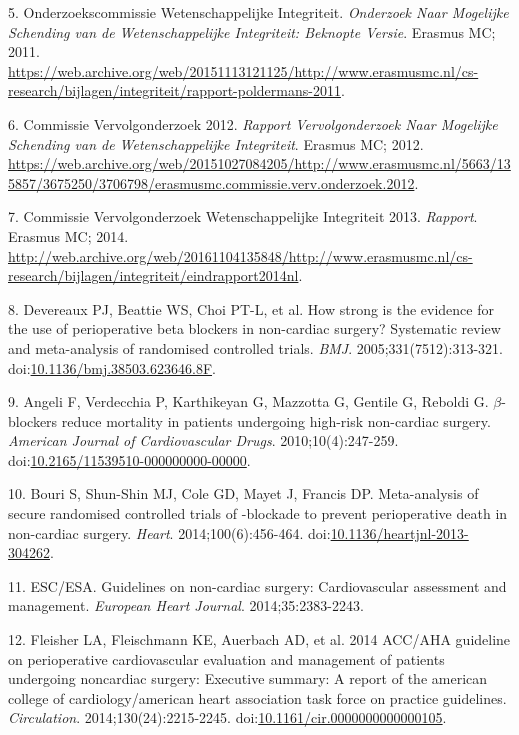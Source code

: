 \documentclass[]{article}
\begin{document}
\hypertarget{ref-commissie2011}{}
5. Onderzoekscommissie Wetenschappelijke Integriteit. \emph{Onderzoek
Naar Mogelijke Schending van de Wetenschappelijke Integriteit: Beknopte
Versie}. Erasmus MC; 2011.
\url{https://web.archive.org/web/20151113121125/http://www.erasmusmc.nl/cs-research/bijlagen/integriteit/rapport-poldermans-2011}.

\hypertarget{ref-commissie2012}{}
6. Commissie Vervolgonderzoek 2012. \emph{Rapport Vervolgonderzoek Naar
Mogelijke Schending van de Wetenschappelijke Integriteit}. Erasmus MC;
2012.
\url{https://web.archive.org/web/20151027084205/http://www.erasmusmc.nl/5663/135857/3675250/3706798/erasmusmc.commissie.verv.onderzoek.2012}.

\hypertarget{ref-commissie2013}{}
7. Commissie Vervolgonderzoek Wetenschappelijke Integriteit 2013.
\emph{Rapport}. Erasmus MC; 2014.
\url{http://web.archive.org/web/20161104135848/http://www.erasmusmc.nl/cs-research/bijlagen/integriteit/eindrapport2014nl}.

\hypertarget{ref-Devereaux313}{}
8. Devereaux PJ, Beattie WS, Choi PT-L, et al. How strong is the
evidence for the use of perioperative beta blockers in non-cardiac
surgery? Systematic review and meta-analysis of randomised controlled
trials. \emph{BMJ}. 2005;331(7512):313-321.
doi:\href{https://doi.org/10.1136/bmj.38503.623646.8F}{10.1136/bmj.38503.623646.8F}.

\hypertarget{ref-Angeli2010}{}
9. Angeli F, Verdecchia P, Karthikeyan G, Mazzotta G, Gentile G, Reboldi
G. \(\beta\)-blockers reduce mortality in patients undergoing high-risk
non-cardiac surgery. \emph{American Journal of Cardiovascular Drugs}.
2010;10(4):247-259.
doi:\href{https://doi.org/10.2165/11539510-000000000-00000}{10.2165/11539510-000000000-00000}.

\hypertarget{ref-bouri2014}{}
10. Bouri S, Shun-Shin MJ, Cole GD, Mayet J, Francis DP. Meta-analysis
of secure randomised controlled trials of -blockade to prevent
perioperative death in non-cardiac surgery. \emph{Heart}.
2014;100(6):456-464.
doi:\href{https://doi.org/10.1136/heartjnl-2013-304262}{10.1136/heartjnl-2013-304262}.

\hypertarget{ref-esc2014}{}
11. ESC/ESA. Guidelines on non-cardiac surgery: Cardiovascular
assessment and management. \emph{European Heart Journal}.
2014;35:2383-2243.

\hypertarget{ref-Fleisher_2014}{}
12. Fleisher LA, Fleischmann KE, Auerbach AD, et al. 2014 ACC/AHA
guideline on perioperative cardiovascular evaluation and management of
patients undergoing noncardiac surgery: Executive summary: A report of
the american college of cardiology/american heart association task force
on practice guidelines. \emph{Circulation}. 2014;130(24):2215-2245.
doi:\href{https://doi.org/10.1161/cir.0000000000000105}{10.1161/cir.0000000000000105}.
\end{document}
